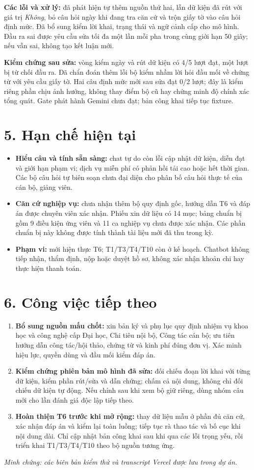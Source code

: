 \documentclass[12pt,a4paper]{article}
\begin{document}
\textbf{Các lỗi và xử lý:} đã phát hiện tự thêm nguồn thứ hai, lẫn dữ kiện đã rút với giá trị \emph{Không}, bỏ câu hỏi ngày khi đang tra căn cứ và trộn giấy tờ vào câu hỏi định mức. Đã bổ sung kiểm lời khai, trạng thái và ngữ cảnh cấp cho mô hình. Đầu ra sai được yêu cầu sửa tối đa một lần mỗi pha trong cùng giới hạn 50 giây; nếu vẫn sai, không tạo kết luận mới.

\textbf{Kiểm chứng sau sửa:} vòng kiểm ngày và rút dữ kiện có 4/5 lượt đạt, một lượt bị từ chối đầu ra. Đã chẩn đoán thêm lỗi bộ kiểm nhầm lời hỏi đầu mối về chứng từ với yêu cầu giấy tờ. Hai câu định mức mới sau sửa đạt 0/2 lượt; đây là kiểm riêng phần chịu ảnh hưởng, không thay điểm bộ cũ hay chứng minh độ chính xác tổng quát. Gate phát hành Gemini chưa đạt; bản công khai tiếp tục fixture.

\section*{5. Hạn chế hiện tại}
\begin{itemize}
\item \textbf{Hiểu câu và tính sẵn sàng:} chat tự do còn lỗi cập nhật dữ kiện, diễn đạt và giới hạn phạm vi; dịch vụ miễn phí có phản hồi tải cao hoặc hết thời gian. Các bộ câu hỏi tự biên soạn chưa đại diện cho phân bố câu hỏi thực tế của cán bộ, giảng viên.
\item \textbf{Căn cứ nghiệp vụ:} chưa nhận thêm bộ quy định gốc, hướng dẫn T6 và đáp án được chuyên viên xác nhận. Phiếu xin dữ liệu có 14 mục; bảng chuẩn bị gồm 9 điều kiện ứng viên và 11 ca nghiệp vụ chưa được xác nhận. Các phần chuẩn bị này không được tính thành tài liệu mới đã thu trong kỳ.
\item \textbf{Phạm vi:} mới hiện thực T6; T1/T3/T4/T10 còn ở kế hoạch. Chatbot không tiếp nhận, thẩm định, nộp hoặc duyệt hồ sơ, không xác nhận khoản chi hay thực hiện thanh toán.
\end{itemize}

\section*{6. Công việc tiếp theo}
\begin{enumerate}
\item \textbf{Bổ sung nguồn mấu chốt:} xin bản ký và phụ lục quy định nhiệm vụ khoa học và công nghệ cấp Đại học, Chi tiêu nội bộ, Công tác cán bộ; ưu tiên hướng dẫn công tác/hội thảo, chứng từ và kinh phí đúng đơn vị. Xác minh hiệu lực, quyền dùng và đầu mối kiểm đáp án.
\item \textbf{Kiểm chứng phiên bản mô hình đã sửa:} đối chiếu đoạn lời khai với từng dữ kiện, kiểm phần rút/sửa và dẫn chứng; chấm cả nội dung, không chỉ đối chiếu dữ kiện tự động. Nếu chỉnh sau khi xem bộ giữ riêng, dùng nhóm câu mới cho lần đánh giá độc lập tiếp theo.
\item \textbf{Hoàn thiện T6 trước khi mở rộng:} thay dữ liệu mẫu ở phần đủ căn cứ, xác nhận đáp án và kiểm lại toàn luồng; tiếp tục rà thao tác và bố cục khi nội dung dài. Chỉ cập nhật bản công khai sau khi qua các lỗi trọng yếu, rồi triển khai T1/T3/T4/T10 theo bộ nguồn tương ứng.
\end{enumerate}
{\footnotesize\textit{Minh chứng: các biên bản kiểm thử và transcript Vercel được lưu trong dự án.}}
\end{document}
